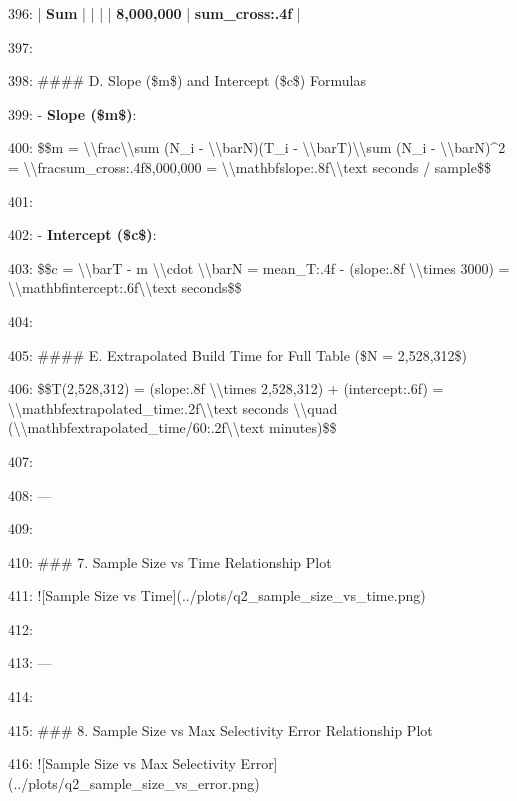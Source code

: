 \documentclass[11pt,a4paper]{article}
\begin{document}
396: | \textbf{Sum} | | | | \textbf{8,000,000} | \textbf{{sum\_cross:.4f}} |

397:

398: \#\#\#\# D. Slope (\$m\$) and Intercept (\$c\$) Formulas

399: - \textbf{Slope (\$m\$)}:

400:   \$\$m = \textbackslash{}\textbackslash{}frac{{\textbackslash{}\textbackslash{}sum (N\_i - \textbackslash{}\textbackslash{}bar{{N}})(T\_i - \textbackslash{}\textbackslash{}bar{{T}})}}{{\textbackslash{}\textbackslash{}sum (N\_i - \textbackslash{}\textbackslash{}bar{{N}})\textasciicircum{}2}} = \textbackslash{}\textbackslash{}frac{{{sum\_cross:.4f}}}{{8,000,000}} = \textbackslash{}\textbackslash{}mathbf{{{slope:.8f}\textbackslash{}\textbackslash{}text{{ seconds / sample}}}}\$\$

401:

402: - \textbf{Intercept (\$c\$)}:

403:   \$\$c = \textbackslash{}\textbackslash{}bar{{T}} - m \textbackslash{}\textbackslash{}cdot \textbackslash{}\textbackslash{}bar{{N}} = {mean\_T:.4f} - ({slope:.8f} \textbackslash{}\textbackslash{}times 3000) = \textbackslash{}\textbackslash{}mathbf{{{intercept:.6f}\textbackslash{}\textbackslash{}text{{ seconds}}}}\$\$

404:

405: \#\#\#\# E. Extrapolated Build Time for Full Table (\$N = 2,528,312\$)

406: \$\$T(2,528,312) = ({slope:.8f} \textbackslash{}\textbackslash{}times 2,528,312) + ({intercept:.6f}) = \textbackslash{}\textbackslash{}mathbf{{{extrapolated\_time:.2f}\textbackslash{}\textbackslash{}text{{ seconds}}}} \textbackslash{}\textbackslash{}quad (\textbackslash{}\textbackslash{}mathbf{{{extrapolated\_time/60:.2f}\textbackslash{}\textbackslash{}text{{ minutes}}}})\$\$

407:

408: ---

409:

410: \#\#\# 7. Sample Size vs Time Relationship Plot

411: ![Sample Size vs Time](../plots/q2\_sample\_size\_vs\_time.png)

412:

413: ---

414:

415: \#\#\# 8. Sample Size vs Max Selectivity Error Relationship Plot

416: ![Sample Size vs Max Selectivity Error](../plots/q2\_sample\_size\_vs\_error.png)
\end{document}
